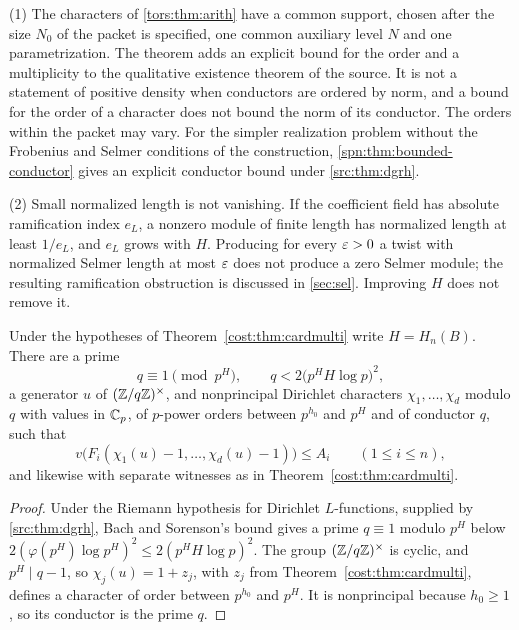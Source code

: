\begin{remark}\label{tors:rem:arith}
(1) The characters of \cref{tors:thm:arith} have a common support, chosen after the
size $N_0$ of the packet is specified, one common auxiliary level $N$ and one
parametrization. The theorem adds an explicit bound for the order and a multiplicity to
the qualitative existence theorem of the source. It is not a statement of positive
density when conductors are ordered by norm, and a bound for the order of a character
does not bound the norm of its conductor. The orders within the packet may vary. For the
simpler realization problem without the Frobenius and Selmer conditions of the
construction, \cref{spn:thm:bounded-conductor} gives an explicit conductor bound under
\cref{src:thm:dgrh}.

(2) Small normalized length is not vanishing. If the coefficient field has absolute
ramification index $e_L$, a nonzero module of finite length has normalized length at
least $1/e_L$, and $e_L$ grows with $H$. Producing for every $\varepsilon>0$ a twist with
normalized Selmer length at most $\varepsilon$ does not produce a zero Selmer module; the
resulting ramification obstruction is discussed in \cref{sec:sel}. Improving $H$ does not
remove it.
\end{remark}

\begin{corollary}\label{cost:cor:cardchar}
Under the hypotheses of Theorem~\ref{cost:thm:cardmulti} write $H=H_n(B)$. There are a
prime
\[
 q\equiv1\pmod{p^H},\qquad q<2\bigl(p^HH\log p\bigr)^2,
\]
a generator $u$ of $(\mathbb{Z}/q\mathbb{Z})^\times$, and nonprincipal Dirichlet characters
$\chi_1,\dots,\chi_d$ modulo $q$ with values in $\mathbb{C}_p$, of $p$-power orders between
$p^{h_0}$ and $p^H$ and of conductor $q$, such that
\[
 v\bigl(F_i(\chi_1(u)-1,\dots,\chi_d(u)-1)\bigr)\le A_i\qquad(1\le i\le n),
\]
and likewise with separate witnesses as in Theorem~\ref{cost:thm:cardmulti}.
\end{corollary}

\begin{proof}
Under the Riemann hypothesis for Dirichlet $L$-functions, supplied by \cref{src:thm:dgrh},
Bach and Sorenson's bound \cite{Bach1996Explicit} gives a prime $q\equiv1$ modulo $p^H$
below $2(\varphi(p^H)\log p^H)^2\le2(p^HH\log p)^2$. The group $(\mathbb{Z}/q\mathbb{Z})^\times$ is cyclic,
and $p^H\mid q-1$, so $\chi_j(u)=1+z_j$, with $z_j$ from Theorem~\ref{cost:thm:cardmulti},
defines a character of order between $p^{h_0}$ and $p^H$. It is nonprincipal because
$h_0\ge1$, so its conductor is the prime $q$.
\end{proof}

